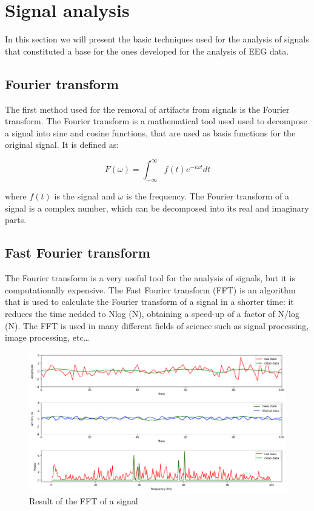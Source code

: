 \documentclass[a4paper]{sapthesis}
\begin{document}
\section{Signal analysis}
In this section we will present the basic techniques used for the analysis
of signals that 
constituted a base for the ones developed for the analysis of EEG data.
\subsection{Fourier transform}\label{sec:fourier}
The first method used for the removal of artifacts from signals is the
Fourier transform\cite{fourier}. The Fourier transform is a mathematical tool used
 used to decompose a signal into sine and cosine functions, that are 
used as basis functions for the original signal.
It is defined as:

\begin{equation}\label{eq:fourier}
F(\omega) = \int_{-\infty}^{\infty} f(t) e^{-i\omega t} dt
\end{equation}

where $f(t)$ is the signal and $\omega$ is the frequency. The Fourier
transform of a signal is a complex number, which can be decomposed into
its real and imaginary parts. 

\subsection{Fast Fourier transform}\label{sec:fft}
The Fourier transform is a very useful tool for the analysis of signals,
but it is computationally expensive. The Fast Fourier transform (FFT)\cite{fft} is
an algorithm that is used to calculate the Fourier transform
of a signal in a shorter time: it reduces the time nedded to Nlog (N),
 obtaining a speed-up of a factor of N/log (N).\newline
The FFT is used  in many different fields of science such as
signal processing, image processing, etc\ldots
\begin{figure}[h]
  \includegraphics[scale=0.5]{fft_waves_result}
  \centering
  \caption{Result of the FFT of a signal
  }\label{fig:fft}
  
  \end{figure}
\end{document}
